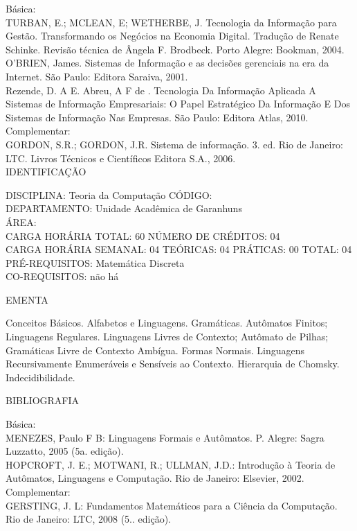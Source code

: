 \documentclass[
	12pt,				%
	openright,			%
  oneside,     %
	a4paper,			%
	english,			%
	french,				%
	spanish,			%
	brazil				%
	]{abntex2}
\begin{document}
\begin{apendicesenv}
Básica:\\
TURBAN, E.; MCLEAN, E; WETHERBE, J. Tecnologia da Informação para
Gestão. Transformando os Negócios na Economia Digital. Tradução de
Renate Schinke. Revisão técnica de Ângela F. Brodbeck. Porto Alegre:
Bookman, 2004.\\
O'BRIEN, James. Sistemas de Informação e as decisões
gerenciais na era da Internet. São Paulo: Editora Saraiva, 2001.\\
Rezende, D. A E. Abreu, A F de . Tecnologia Da Informação Aplicada A
Sistemas de Informação Empresariais: O Papel Estratégico Da Informação
E Dos Sistemas de Informação Nas Empresas. São Paulo: Editora Atlas, 2010.\\
Complementar:\\
GORDON, S.R.; GORDON, J.R. Sistema de informação. 3. ed. Rio de Janeiro:
LTC. Livros Técnicos e Científicos Editora S.A., 2006.\\


\newpage IDENTIFICAÇÃO

DISCIPLINA: Teoria da Computação CÓDIGO:\\
DEPARTAMENTO: Unidade Acadêmica de Garanhuns\\
ÁREA: \\
CARGA HORÁRIA TOTAL: 60 NÚMERO DE CRÉDITOS: 04\\
CARGA HORÁRIA SEMANAL: 04 TEÓRICAS: 04 PRÁTICAS: 00 TOTAL: 04\\
PRÉ-REQUISITOS: Matemática Discreta\\
CO-REQUISITOS: não há

EMENTA 

Conceitos Básicos. Alfabetos e Linguagens. Gramáticas. Autômatos
Finitos; Linguagens Regulares. Linguagens Livres de Contexto; Autômato
de Pilhas; Gramáticas Livre de Contexto Ambígua. Formas Normais.
Linguagens Recursivamente Enumeráveis e Sensíveis ao Contexto.
Hierarquia de Chomsky. Indecidibilidade.

BIBLIOGRAFIA 

Básica:\\
MENEZES, Paulo F B: Linguagens Formais e Autômatos. P. Alegre: Sagra
Luzzatto, 2005 (5a. edição).\\
HOPCROFT, J. E.; MOTWANI, R.; ULLMAN, J.D.: Introdução à Teoria de
Autômatos, Linguagens e Computação. Rio de Janeiro: Elsevier, 2002.\\
Complementar:\\
GERSTING, J. L: Fundamentos Matemáticos para a Ciência da Computação.
Rio de Janeiro: LTC, 2008 (5.. edição).\\


\end{apendicesenv}
\end{document}
